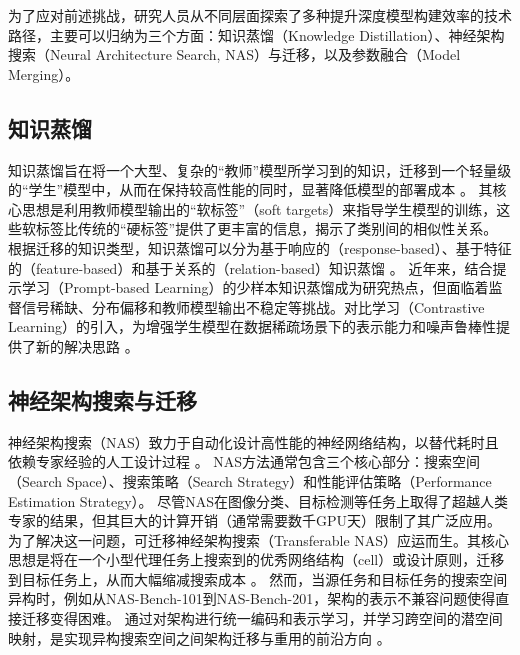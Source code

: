 为了应对前述挑战，研究人员从不同层面探索了多种提升深度模型构建效率的技术路径，主要可以归纳为三个方面：知识蒸馏（Knowledge Distillation）、神经架构搜索（Neural Architecture Search, NAS）与迁移，以及参数融合（Model Merging）。

\subsection[\hspace{-2pt}知识蒸馏]{{\heiti{} \hspace{-8pt}知识蒸馏}}
知识蒸馏旨在将一个大型、复杂的“教师”模型所学习到的知识，迁移到一个轻量级的“学生”模型中，从而在保持较高性能的同时，显著降低模型的部署成本 \cite{hinton2015distilling}。
其核心思想是利用教师模型输出的“软标签”（soft targets）来指导学生模型的训练，这些软标签比传统的“硬标签”提供了更丰富的信息，揭示了类别间的相似性关系。
根据迁移的知识类型，知识蒸馏可以分为基于响应的（response-based）、基于特征的（feature-based）和基于关系的（relation-based）知识蒸馏 \cite{gou2021knowledge}。
近年来，结合提示学习（Prompt-based Learning）的少样本知识蒸馏成为研究热点，但面临着监督信号稀缺、分布偏移和教师模型输出不稳定等挑战。对比学习（Contrastive Learning）的引入，为增强学生模型在数据稀疏场景下的表示能力和噪声鲁棒性提供了新的解决思路 \cite{tian2019contrastive}。

\subsection[\hspace{-2pt}神经架构搜索与迁移]{{\heiti{} \hspace{-8pt}神经架构搜索与迁移}}
神经架构搜索（NAS）致力于自动化设计高性能的神经网络结构，以替代耗时且依赖专家经验的人工设计过程 \cite{elsken2019neural}。
NAS方法通常包含三个核心部分：搜索空间（Search Space）、搜索策略（Search Strategy）和性能评估策略（Performance Estimation Strategy）。
尽管NAS在图像分类、目标检测等任务上取得了超越人类专家的结果，但其巨大的计算开销（通常需要数千GPU天）限制了其广泛应用。
为了解决这一问题，可迁移神经架构搜索（Transferable NAS）应运而生。其核心思想是将在一个小型代理任务上搜索到的优秀网络结构（cell）或设计原则，迁移到目标任务上，从而大幅缩减搜索成本 \cite{zoph2018learning}。
然而，当源任务和目标任务的搜索空间异构时，例如从NAS-Bench-101到NAS-Bench-201，架构的表示不兼容问题使得直接迁移变得困难。
通过对架构进行统一编码和表示学习，并学习跨空间的潜空间映射，是实现异构搜索空间之间架构迁移与重用的前沿方向 \cite{chen2021bridge}。

